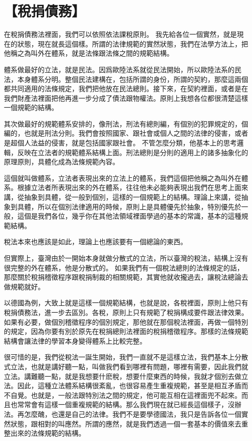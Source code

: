 \documentclass[oneside,sub3section]{ctexbook}
\begin{document}
\hypertarget{ux7a05ux6350ux50b5ux52d9}{%
\chapter{【稅捐債務】}\label{ux7a05ux6350ux50b5ux52d9}}

在稅捐債務法裡面，我們可以依照依法課稅原則。
我先給各位一個實然，就是現在的狀態，現在就長這個樣。所謂的法律規範的實然狀態，我們在法學方法上，把他稱之為叫外在體系，就是法條跟法條之間的規範結構。

體系做最好的立法，就是民法。因爲歐陸法系就從民法開始，所以歐陸法系的民法，本身體系分明。整個民法建構在，包括所謂的身份，所謂的契約，那麼這兩個都共同適用的法條規定，我們把他放在民法總則。接下來，在契約裡面，或者是在我們財產法裡面把他再進一步分成了債法跟物權法。原則上我想各位都很清楚這樣一個規範的結構。

其次做最好的規範體系安排的，像刑法，刑法有總則編，有個別的犯罪規定的，個編的，也就是刑法分則。我們會按照國家、跟社會或個人之間的法律的侵害，或者是超個人法益的侵害，就是包括國家跟社會。
不管怎麼分類，他基本上的思考邏輯，反映在立法者的規範體系結構上面。刑法總則是分則的適用上的諸多抽象化的原理原則，具體化成為法條規範內容。

這個就叫做體系，立法者表現出來的立法上的體系，我們這個把他稱之為叫外在體系。根據立法者所表現出來的外在體系，往往他未必能夠表現出我們在思考上面來講，從抽象到具體，從一般到個別，這樣的一個規範上的結構。理論上來講，從抽象到具體，所以在個別法律適用的時候，原則上是具體優先於抽象，特別優先於一般，這個是我們各位，幾乎你在其他法領域裡面學過的基本的常識，基本的這種規範結構。

稅法本來也應該是如此，理論上也應該要有一個總論的東西。

但實際上，臺灣由於一開始本身就做分散式的立法，所以臺灣的稅法，結構上沒有很完整的外在體系，他是分散式的。
如果我們有一個稅法總則的法條規定的話，那麼關於稅捐稽徵程序跟稅捐制裁的相關規範，其實他就收攏過去，讓稅法總論去做規範就好。

以德國為例，大致上就是這樣一個規範結構，也就是說，各稅裡面，原則上他只有稅捐債務法，進一步去區別。各稅，原則上只有規範了稅捐構成要件跟法律效果。如果有必要，做個別稽徵程序的個別規定，那他就在那個稅法裡面，再做一個特別的規定，因為你要有別於原先在稅捐總則法裡面的稅捐稽徵程序。那樣的法條規範結構會讓法律的學習本身變得體系上比較完整。

很可惜的是，我們從稅法一誕生開始，我們一直就不是這樣立法，我們基本上分散式立法，也就是講好聽一點，叫做我們看到哪裡有問題，哪裡有需要，因此我們就立法。講難聽一點，就是我想要什麽稅，想要什麼東西的時候，我就才個別去做立法。因此，這種立法體系結構很紊亂，也很容易產生重複規範，甚至是相互矛盾而不自覺。也就是，一般法跟特別法之間的規定，他可能互相在這裡面兜不起來。而且也常常會有這樣一個重複規範的結構。那么我們現在就已經長這個樣子，沒辦法。再怎麼醜，也還是自己的法律。我們不是要學德國法，我只是告訴各位一個實然狀態，跟相對的叫應然。所謂的應然，就是我們透過一個一套基本的價值來去重整出來的法條規範的結構。
\end{document}
